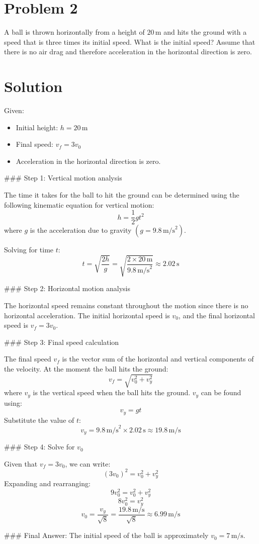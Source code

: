 \documentclass{article}
\begin{document}
\section*{Problem 2}
A ball is thrown horizontally from a height of $20 \, \text{m}$ and hits the ground with a speed that is three times its initial speed. What is the initial speed? Assume that there is no air drag and therefore acceleration in the horizontal direction is zero.

\section*{Solution}

Given:
\begin{itemize}
    \item Initial height: $h = 20 \, \text{m}$
    \item Final speed: $v_f = 3v_0$
    \item Acceleration in the horizontal direction is zero.
\end{itemize}

### Step 1: Vertical motion analysis

The time it takes for the ball to hit the ground can be determined using the following kinematic equation for vertical motion:
\[
h = \frac{1}{2} g t^2
\]
where \( g \) is the acceleration due to gravity \( (g = 9.8 \, \text{m/s}^2) \). 

Solving for time \( t \):
\[
t = \sqrt{\frac{2h}{g}} = \sqrt{\frac{2 \times 20 \, \text{m}}{9.8 \, \text{m/s}^2}} \approx 2.02 \, \text{s}
\]

### Step 2: Horizontal motion analysis

The horizontal speed remains constant throughout the motion since there is no horizontal acceleration. The initial horizontal speed is \( v_0 \), and the final horizontal speed is \( v_f = 3v_0 \).

### Step 3: Final speed calculation

The final speed \( v_f \) is the vector sum of the horizontal and vertical components of the velocity. At the moment the ball hits the ground:
\[
v_f = \sqrt{v_0^2 + v_y^2}
\]
where \( v_y \) is the vertical speed when the ball hits the ground. \( v_y \) can be found using:
\[
v_y = g t
\]
Substitute the value of \( t \):
\[
v_y = 9.8 \, \text{m/s}^2 \times 2.02 \, \text{s} \approx 19.8 \, \text{m/s}
\]

### Step 4: Solve for \( v_0 \)

Given that \( v_f = 3v_0 \), we can write:
\[
(3v_0)^2 = v_0^2 + v_y^2
\]
Expanding and rearranging:
\[
9v_0^2 = v_0^2 + v_y^2
\]
\[
8v_0^2 = v_y^2
\]
\[
v_0 = \frac{v_y}{\sqrt{8}} = \frac{19.8 \, \text{m/s}}{\sqrt{8}} \approx 6.99 \, \text{m/s}
\]

### Final Answer:
The initial speed of the ball is approximately \( v_0 = 7 \, \text{m/s} \).
\end{document}
